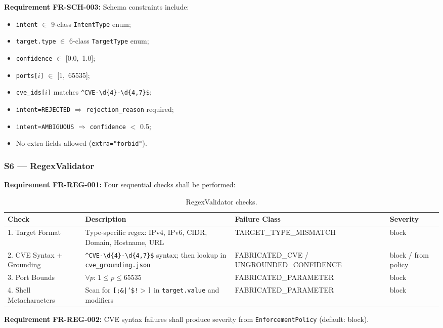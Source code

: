 ﻿\documentclass[10pt,journal,onecolumn]{IEEEtran}
\newcommand{\reqid}[1]{\textbf{#1}}
\begin{document}
\reqid{Requirement FR-SCH-003:} Schema constraints include:
\begin{itemize}
\item \texttt{intent} $\in$ 9-class \texttt{IntentType} enum;
\item \texttt{target.type} $\in$ 6-class \texttt{TargetType} enum;
\item \texttt{confidence} $\in$ [0.0,~1.0];
\item \texttt{ports[$i$]} $\in$ [1,~65535];
\item \texttt{cve\_ids[$i$]} matches \texttt{\^{}CVE-\textbackslash d\{4\}-\textbackslash d\{4,7\}\$};
\item \texttt{intent=REJECTED} $\Rightarrow$ \texttt{rejection\_reason} required;
\item \texttt{intent=AMBIGUOUS} $\Rightarrow$ \texttt{confidence} $<$ 0.5;
\item No extra fields allowed (\texttt{extra="forbid"}).
\end{itemize}

\subsubsection{S6 --- RegexValidator}
\reqid{Requirement FR-REG-001:} Four sequential checks shall be performed:
\begin{table}[t]
\caption{RegexValidator checks.}
\label{tab:regex}
\begin{tabularx}{\textwidth}{l X l l}
\toprule
\textbf{Check} & \textbf{Description} & \textbf{Failure Class} & \textbf{Severity}\\
\midrule
1. Target Format & Type-specific regex: IPv4, IPv6, CIDR, Domain, Hostname, URL & TARGET\_TYPE\_MISMATCH & block\\
2. CVE Syntax + Grounding & \texttt{\^{}CVE-\textbackslash d\{4\}-\textbackslash d\{4,7\}\$} syntax; then lookup in \texttt{cve\_grounding.json} & FABRICATED\_CVE / UNGROUNDED\_CONFIDENCE & block / from policy\\
3. Port Bounds & $\forall p$: $1 \leq p \leq 65535$ & FABRICATED\_PARAMETER & block\\
4. Shell Metacharacters & Scan for \texttt{[;\&|`\$!$>$]} in \texttt{target.value} and modifiers & FABRICATED\_PARAMETER & block\\
\bottomrule
\end{tabularx}
\end{table}

\reqid{Requirement FR-REG-002:} CVE syntax failures shall produce severity from \texttt{EnforcementPolicy} (default: block).
\end{document}
